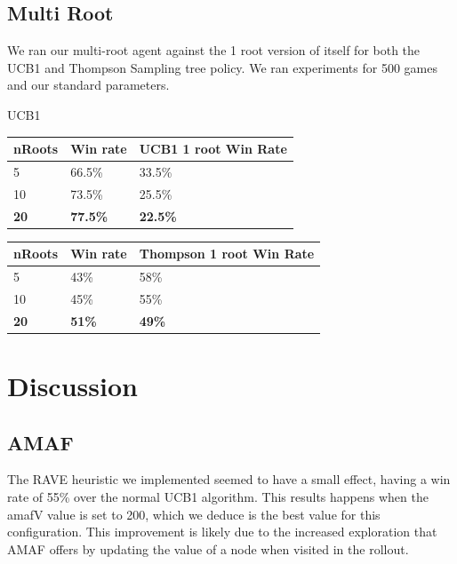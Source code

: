 \documentclass[conference]{IEEEtran}
\begin{document}
\subsection{Multi Root}
We ran our multi-root agent against the 1 root version of itself for both the UCB1 and Thompson Sampling tree policy. We ran experiments for 500 games and our standard parameters.

UCB1
\begin{table}[H]
\begin{tabular}{|l|l|l|}
\hline
\textbf{nRoots} & \textbf{Win rate} & \textbf{UCB1 1 root Win Rate} \\ \hline
5               & 66.5\%            & 33.5\%                        \\ \hline
10              & 73.5\%            & 25.5\%                        \\ \hline
\textbf{20}     & \textbf{77.5\%}   & \textbf{22.5\%}               \\ \hline
\end{tabular}
\end{table}

\begin{table}[]
\begin{tabular}{|l|l|l|}
\hline
\textbf{nRoots} & \textbf{Win rate} & \textbf{Thompson 1 root Win Rate} \\ \hline
5               & 43\%              & 58\%                              \\ \hline
10              & 45\%              & 55\%                              \\ \hline
\textbf{20}     & \textbf{51\%}     & \textbf{49\%}                     \\ \hline
\end{tabular}
\end{table}

\section{Discussion}

\subsection{AMAF}
The RAVE heuristic we implemented seemed to have a small effect, having a win rate of 55\% over the normal UCB1 algorithm. This results happens when the amafV value is set to 200, which we deduce is the best value for this configuration. This improvement is likely due to the increased exploration that AMAF offers by updating the value of a node when visited in the rollout.
\end{document}
